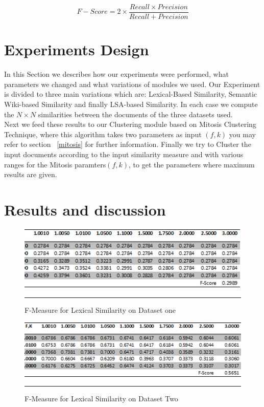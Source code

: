\begin{equation}
\label{fmeasure}
F-Score = 2\times \frac {Recall\times Precision}{Recall + Precision}
\end{equation}

\section{Experiments Design}\label{sec:test}
In this Section we describes how our experiments were performed, what parameters we changed and what variations of modules we used.
Our Experiment is divided to three main variations which are: Lexical-Based Similarity, Semantic Wiki-based Similarity and finally LSA-based Similarity. In each case we compute the $N\times N$ similarities between the documents of the three datasets used.\\
Next we feed these results to our Clustering module based on Mitosis Clustering Technique, where this algorithm takes two parameters as input $(f,k)$ you may refer to section ~\ref{mitosis} for further information.
Finally we try to Cluster the input documents according to the input similarity measure and with various ranges for the Mitosis paramters$(f,k)$, to get the parameters where maximum results are given.

\section{Results and discussion}\label{sec:results}

\begin{figure}[htbp]
	\centering
		\includegraphics{./Figures/lexical_F_DS1.png}
		\rule{35em}{0.5pt}
	\caption[F-Measure for Lexical Similarity on Dataset one]{F-Measure for Lexical Similarity on Dataset one}
	\label{fig:purity1}
\end{figure}

\begin{figure}[htbp]
	\centering
		\includegraphics{./Figures/lexical_F_DS2.png}
		\rule{35em}{0.5pt}
	\caption[F-Measure for Lexical Similarity on Dataset Two]{F-Measure for Lexical Similarity on Dataset Two}
	\label{fig:purity2}
\end{figure}

